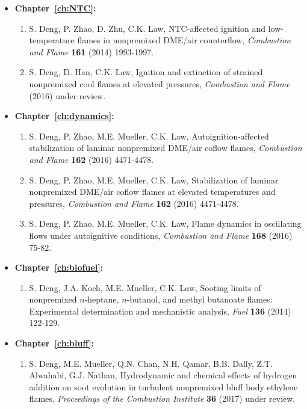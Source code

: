 \begin{itemize}
  \item \textbf{Chapter~\ref{ch:NTC}:}
    \begin{enumerate}
    \item S. Deng, P. Zhao, D. Zhu, C.K. Law, NTC-affected ignition and low-temperature flames in nonpremixed DME/air counterflow, \textit{Combustion and Flame} \textbf{161} (2014) 1993-1997.
    \item S. Deng, D. Han, C.K. Law, Ignition and extinction of strained nonpremixed cool flames at elevated pressures, \textit{Combustion and Flame} (2016) under review.
    \end{enumerate}
  \item \textbf{Chapter~\ref{ch:dynamics}:}
    \begin{enumerate}[resume]
    \item S. Deng, P. Zhao, M.E. Mueller, C.K. Law, Autoignition-affected stabilization of laminar nonpremixed DME/air coflow flames, \textit{Combustion and Flame} \textbf{162} (2016) 4471-4478.
    \item S. Deng, P. Zhao, M.E. Mueller, C.K. Law, Stabilization of laminar nonpremixed DME/air coflow flames at elevated temperatures and pressures, \textit{Combustion and Flame} \textbf{162} (2016) 4471-4478.
    \item S. Deng, P. Zhao, M.E. Mueller, C.K. Law, Flame dynamics in oscillating flows under autoignitive conditions, \textit{Combustion and Flame} \textbf{168} (2016) 75-82.
    \end{enumerate}
  \item \textbf{Chapter~\ref{ch:biofuel}:}
    \begin{enumerate}[resume]
    \item S. Deng, J.A. Koch, M.E. Mueller, C.K. Law, Sooting limits of nonpremixed $n$-heptane, $n$-butanol, and methyl butanoate flames: Experimental determination and mechanistic analysis, \textit{Fuel} \textbf{136} (2014) 122-129.
    \end{enumerate}
  \item \textbf{Chapter~\ref{ch:bluff}:}
    \begin{enumerate}[resume]
    \item S. Deng, M.E. Mueller, Q.N. Chan, N.H. Qamar, B.B. Dally, Z.T. Alwahabi, G.J. Nathan, Hydrodynamic and chemical effects of hydrogen addition on soot evolution in turbulent nonpremixed bluff body ethylene flames, \textit{Proceedings of the Combustion Institute} \textbf{36} (2017) under review.

\end{enumerate}
\end{itemize}
